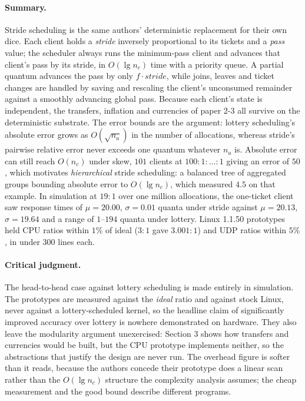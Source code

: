 \paragraph{Summary.}
Stride scheduling is the same authors' deterministic replacement for their own dice. Each client
holds a \emph{stride} inversely proportional to its tickets and a \emph{pass} value; the
scheduler always runs the minimum-pass client and advances that client's pass by its stride, in
$O(\lg n_c)$ time with a priority queue. A partial quantum advances the pass by only
$f \cdot \mathit{stride}$, while joins, leaves and ticket changes are handled by saving and
rescaling the client's unconsumed remainder against a smoothly advancing global pass. Because
each client's state is independent, the transfers, inflation and currencies of paper 2-3 all
survive on the deterministic substrate. The error
bounds are the argument: lottery scheduling's absolute error grows as $O(\sqrt{n_a})$ in the
number of allocations, whereas stride's pairwise relative error never exceeds one quantum
whatever $n_a$ is. Absolute error can still reach $O(n_c)$ under skew, $101$ clients at
$100\!:\!1\!:\!\dots\!:\!1$ giving an error of $50$, which motivates \emph{hierarchical} stride
scheduling: a balanced tree of aggregated groups bounding absolute error to $O(\lg n_c)$, which
measured $4.5$ on that example. In simulation at $19\!:\!1$ over one million allocations, the
one-ticket client saw response times of $\mu = 20.00$, $\sigma = 0.01$ quanta under stride
against $\mu = 20.13$, $\sigma = 19.64$ and a range of $1$--$194$ quanta under lottery. Linux
1.1.50 prototypes held CPU ratios within $1\%$ of ideal ($3\!:\!1$ gave $3.001\!:\!1$) and UDP
ratios within $5\%$, in under 300 lines each.

\paragraph{Critical judgment.}
The head-to-head case against lottery scheduling is made entirely in simulation. The prototypes
are measured against the \emph{ideal} ratio and against stock Linux, never against a
lottery-scheduled kernel, so the headline claim of significantly improved accuracy over lottery
is nowhere demonstrated on hardware. They also leave the modularity argument unexercised:
Section 3 shows how transfers and currencies would be built, but the CPU prototype implements
neither, so the abstractions that justify the design are never run. The overhead figure is softer
than it reads, because the authors concede their prototype does a linear scan rather than the
$O(\lg n_c)$ structure the complexity analysis assumes; the cheap measurement and the good bound
describe different programs.

